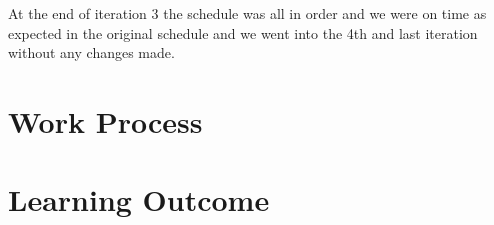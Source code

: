 At the end of iteration 3 the schedule was all in order and we were on time as expected in the original schedule and we went into the 4th and last iteration without any changes made.


\section{Work Process}



\section{Learning Outcome}

